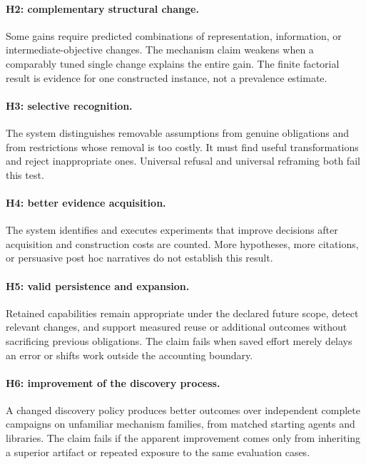 \documentclass[11pt,letterpaper]{article}
\theoremstyle{remark}\newtheorem{remark}{Remark}[section]
\begin{document}
\paragraph{H2: complementary structural change.}
Some gains require predicted combinations of representation, information, or intermediate-objective changes. The mechanism claim weakens when a comparably tuned single change explains the entire gain. The finite factorial result is evidence for one constructed instance, not a prevalence estimate.

\paragraph{H3: selective recognition.}
The system distinguishes removable assumptions from genuine obligations and from restrictions whose removal is too costly. It must find useful transformations and reject inappropriate ones. Universal refusal and universal reframing both fail this test.

\paragraph{H4: better evidence acquisition.}
The system identifies and executes experiments that improve decisions after acquisition and construction costs are counted. More hypotheses, more citations, or persuasive post hoc narratives do not establish this result.

\paragraph{H5: valid persistence and expansion.}
Retained capabilities remain appropriate under the declared future scope, detect relevant changes, and support measured reuse or additional outcomes without sacrificing previous obligations. The claim fails when saved effort merely delays an error or shifts work outside the accounting boundary.

\paragraph{H6: improvement of the discovery process.}
A changed discovery policy produces better outcomes over independent complete campaigns on unfamiliar mechanism families, from matched starting agents and libraries. The claim fails if the apparent improvement comes only from inheriting a superior artifact or repeated exposure to the same evaluation cases.
\end{document}
